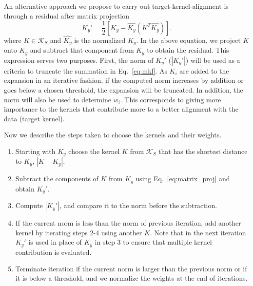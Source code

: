 \documentclass[reprint,amsfonts, amssymb, amsmath,  showkeys, nofootinbib,pra, superscriptaddress, twocolumn,longbibliography]{revtex4-2}
\begin{document}
An alternative approach we propose to carry out target-kernel-alignment is through a residual after matrix projection
\begin{equation}
    K_y' =  \frac{1}{2} \left[ K_y - \hat{K_y} (K^T \hat{K_y}) \right].
    \label{eq:matrix_proj}
\end{equation}
where $K\in \mathcal{K}_S$ and $\hat{K_y}$ is the normalized $K_y$. 
In the above equation, we project $K$ onto $K_y$ and subtract that component from $K_y$ to obtain the residual.
This expression serves two purposes. First, the norm of $K_y'$ ($|K_y'|$) will be used as a criteria to truncate the summation in Eq.~\ref{eq:mkl}. As $K_i$ are added to the expansion in an iterative fashion, if the computed norm increases by addition or goes below a chosen threshold, the expansion will be truncated. In addition, the norm will also be used to determine $w_i$. This corresponds to giving more importance to the kernels that contribute more to a better alignment with the data (target kernel).

Now we describe the steps taken to choose the kernels and their weights.
\begin{enumerate}
    \item Starting with $K_y$ choose the kernel $K$ from $\mathcal{K}_S$ that has the shortest distance to $K_y$, $\left| K - K_y \right|$.
    \item Subtract the components of $K$ from $K_y$ using Eq.~\ref{eq:matrix_proj} and obtain $K_y'$.
    \item Compute $\left|K_y'\right|$, and compare it to the norm before the subtraction.
    \item If the current norm is less than the norm of previous iteration, add another kernel by iterating steps 2-4 using another $K$. Note that in the next iteration $K_y'$ is used in place of $K_y$ in step 3 to ensure that multiple kernel contribution is evaluated.
    \item Terminate iteration if the current norm is larger than the previous norm or if it is below a threshold, and we normalize the weights at the end of iterations.
\end{enumerate}
\end{document}
